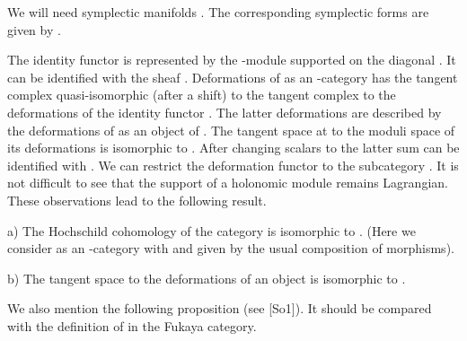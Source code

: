 \documentclass[a4paper,12pt]{article}
\begin{document}
We will  need symplectic manifolds \coordHE{}. The corresponding symplectic forms
are given by \coordHE{}.


The identity functor \coordHE{} is represented by the  \coordHE{}-module
\coordHE{}  supported on the diagonal \coordHE{}.
It can be  identified with the sheaf  \coordHE{}.
Deformations of \coordHE{} as an \myHighlight{$\A$}\coordHE{}-category has the tangent complex
quasi-isomorphic (after a shift) to the tangent
complex to the  deformations of the identity functor \coordHE{}.
The latter deformations are described by the deformations
of \coordHE{} as an object of \coordHE{}.  The tangent space at  \coordHE{}
 to the moduli space of its 
deformations is isomorphic to \coordHE{}.
After changing scalars to \coordHE{} the latter sum can be identified with \coordHE{}.
We can restrict the deformation functor to the subcategory \coordHE{}. It is not difficult
to see that the support of a holonomic module remains Lagrangian. 
These observations lead to the following result.


\begin{prp} 
a) The Hochschild cohomology of the category 
\coordHE{} is isomorphic to  \coordHE{}.
(Here we consider \coordHE{} as an \myHighlight{$\A$}\coordHE{}-category with \coordHE{} and \coordHE{} given
by the usual composition of morphisms).

b) The tangent space to the deformations of an object \coordHE{} is
isomorphic to  \coordHE{}.

\end{prp}


We also mention the following proposition (see [So1]). It should be compared
with the definition of \coordHE{} in the Fukaya category.
\end{document}
